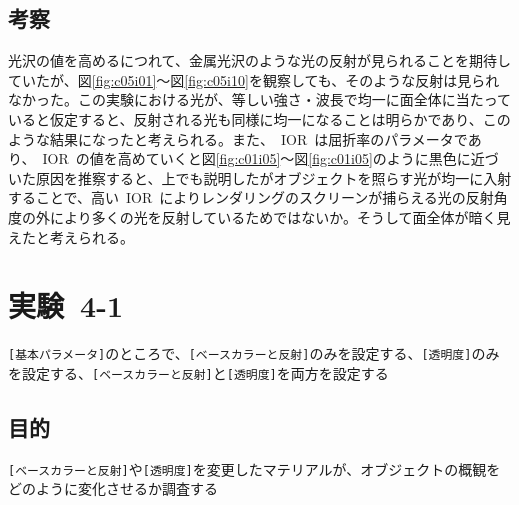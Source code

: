 \documentclass[a4j]{jarticle}
\begin{document}
\subsection{考察}
%
光沢の値を高めるにつれて、金属光沢のような光の反射が見られることを期待していたが、図\ref{fig:c05i01}～図\ref{fig:c05i10}を観察しても、そのような反射は見られなかった。この実験における光が、等しい強さ・波長で均一に面全体に当たっていると仮定すると、反射される光も同様に均一になることは明らかであり、このような結果になったと考えられる。また、\ IOR\ は屈折率のパラメータであり、\ IOR\ の値を高めていくと図\ref{fig:c01i05}～図\ref{fig:c01i05}のように黒色に近づいた原因を推察すると、上でも説明したがオブジェクトを照らす光が均一に入射することで、高い\ IOR\ によりレンダリングのスクリーンが捕らえる光の反射角度の外により多くの光を反射しているためではないか。そうして面全体が暗く見えたと考えられる。
%

\newpage
\section{実験\ 4-1}
\verb|[基本パラメータ]|のところで、\verb|[ベースカラーと反射]|のみを設定する、\verb|[透明度]|のみを設定する、\verb|[ベースカラーと反射]|と\verb|[透明度]|を両方を設定する
\subsection{目的}
%
\verb|[ベースカラーと反射]|や\verb|[透明度]|を変更したマテリアルが、オブジェクトの概観をどのように変化させるか調査する
%
\end{document}
